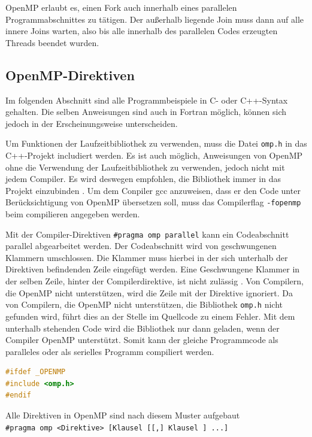 \documentclass[../main.tex]{subfiles}
\begin{document}
OpenMP erlaubt es, einen Fork auch innerhalb eines parallelen Programmabschnittes zu tätigen. Der außerhalb liegende Join muss dann auf alle innere Joins warten, also bis alle innerhalb des parallelen Codes erzeugten Threads beendet wurden.

\subsection{OpenMP-Direktiven}

Im folgenden Abschnitt sind alle Programmbeispiele in C- oder C++-Syntax gehalten. Die selben Anweisungen sind auch in Fortran möglich, können sich jedoch in der Erscheinungsweise unterscheiden.

Um Funktionen der Laufzeitbibliothek zu verwenden, muss die Datei \texttt{omp.h} in das C++-Projekt includiert werden. Es ist auch möglich, Anweisungen von OpenMP ohne die Verwendung der Laufzeitbibliothek zu verwenden, jedoch nicht mit jedem Compiler. Es wird deswegen empfohlen, die Bibliothek immer in das Projekt einzubinden \cite{articleOpenMP}. Um dem Conpiler gcc anzuweisen, dass er den Code unter Berücksichtigung von OpenMP übersetzen soll, muss das Compilerflag \texttt{-fopenmp} beim compilieren angegeben werden. \par
Mit der Compiler-Direktiven \texttt{\#pragma\ omp\ parallel} kann ein Codeabschnitt parallel abgearbeitet werden. Der Codeabschnitt wird von geschwungenen Klammern umschlossen. Die Klammer muss hierbei in der sich unterhalb der Direktiven befindenden Zeile eingefügt werden. Eine Geschwungene Klammer in der selben Zeile, hinter der Compilerdirektive, ist nicht zulässig \cite{articleOpenMP}. Von Compilern, die OpenMP nicht unterstützen, wird die Zeile mit der Direktive ignoriert. Da von Compilern, die OpenMP nicht unterstützen, die Bibliothek \texttt{omp.h} nicht gefunden wird, führt dies an der Stelle im Quellcode zu einem Fehler. Mit dem unterhalb stehenden Code wird die Bibliothek nur dann geladen, wenn der Compiler OpenMP unterstützt. Somit kann der gleiche Programmcode als paralleles oder als serielles Programm compiliert werden.
\begin{lstlisting}[language=c++, caption=Includieren der Bibliothek omp.h, captionpos=b, label=listing:include_omp, frame=single, linewidth=\textwidth, breaklines=true]
#ifdef _OPENMP
#include <omp.h>
#endif
\end{lstlisting}
Alle Direktiven in OpenMP sind nach diesem Muster aufgebaut \texttt{\#pragma\ omp\ <Direktive>\ [Klausel\ [[,]\ Klausel\ ]\ ...]}
\end{document}
